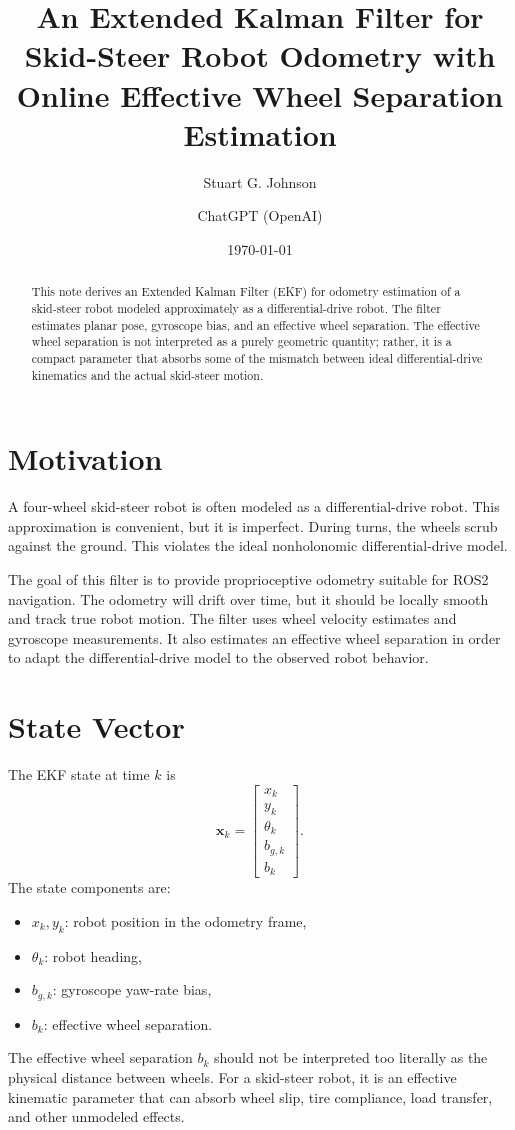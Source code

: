 \documentclass[11pt]{article}
\title{An Extended Kalman Filter for Skid-Steer Robot Odometry with Online Effective Wheel Separation Estimation}
\author{
Stuart G. Johnson \and ChatGPT (OpenAI)
}
\date{\today}
\begin{document}
\maketitle

\begin{abstract}
This note derives an Extended Kalman Filter (EKF) for odometry estimation
of a skid-steer robot modeled approximately as a differential-drive robot.
The filter estimates planar pose, gyroscope bias, and an effective wheel
separation. The effective wheel separation is not interpreted as a purely
geometric quantity; rather, it is a compact parameter that absorbs some
of the mismatch between ideal differential-drive kinematics and the
actual skid-steer motion.
\end{abstract}

\section{Motivation}

A four-wheel skid-steer robot is often modeled as a differential-drive
robot. This approximation is convenient, but it is imperfect. During
turns, the wheels scrub against the ground. This violates the ideal
nonholonomic differential-drive model.

The goal of this filter is to provide proprioceptive odometry suitable for ROS2
navigation. The odometry will drift over time, but it should
be locally smooth and track true robot motion. The filter uses wheel
velocity estimates and gyroscope measurements. It also estimates an effective
wheel separation in order to adapt the differential-drive model to the
observed robot behavior.

\section{State Vector}

The EKF state at time $k$ is
\begin{equation}
\mathbf{x}_k =
\begin{bmatrix}
x_k \\
y_k \\
\theta_k \\
b_{g,k} \\
b_k
\end{bmatrix}.
\end{equation}
The state components are:
\begin{itemize}
\item $x_k,y_k$: robot position in the odometry frame,
\item $\theta_k$: robot heading,
\item $b_{g,k}$: gyroscope yaw-rate bias,
\item $b_k$: effective wheel separation.
\end{itemize}
The effective wheel separation $b_k$ should not be interpreted too
literally as the physical distance between wheels. For a skid-steer
robot, it is an effective kinematic parameter that can absorb wheel slip,
tire compliance, load transfer, and other unmodeled effects.
\end{document}
